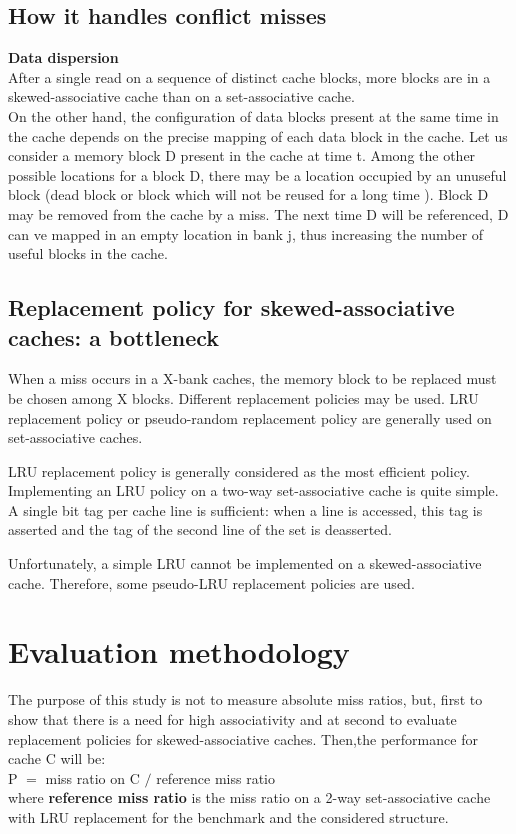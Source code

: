 \documentclass{article}
\begin{document}
\begin{large}
\subsection{How it handles conflict misses}
\textbf{Data dispersion}\\After a single read on a sequence of distinct cache blocks, more blocks are in a skewed-associative cache than on a set-associative cache.\\
\qquad On the other hand, the configuration of data blocks present at the same time in the cache depends on the precise mapping of each data block in the cache. Let us consider a memory block D present in the cache at time t. Among the other possible locations for a block D, there may be a location occupied by an unuseful block (dead block or block which will not be reused for a long time ). Block D may be removed from the cache by a miss. The next time D will be referenced, D can ve mapped in an empty location in bank j, thus increasing the number of useful blocks in the cache. 

\subsection{Replacement policy for skewed-associative caches: a bottleneck}
When a miss occurs in a X-bank caches, the memory block
to be replaced must be chosen among X blocks. Different replacement policies may be used. LRU replacement policy or pseudo-random replacement policy are generally used on set-associative caches.

\qquad LRU replacement policy is generally considered as the most efficient policy. Implementing an LRU policy on a two-way set-associative cache is quite simple. A single bit tag per cache line is sufficient: when a line is accessed, this tag is asserted and the tag of the second line of the set is deasserted.

\qquad Unfortunately, a simple LRU cannot be implemented on a skewed-associative cache. Therefore, some pseudo-LRU replacement policies are used.

\section{Evaluation methodology}
The purpose of this study is not to measure absolute miss ratios, but, first
to show that there is a need for high associativity and at second to
evaluate replacement policies for skewed-associative caches.
\qquad Then,the performance for cache C will be:\\
P $=$ miss ratio on C $/$ reference miss ratio\\
\qquad where \textbf{reference miss ratio} is the miss ratio on a 2-way
set-associative cache with LRU replacement for the benchmark and the
considered structure.\\


\end{large}
\end{document}
